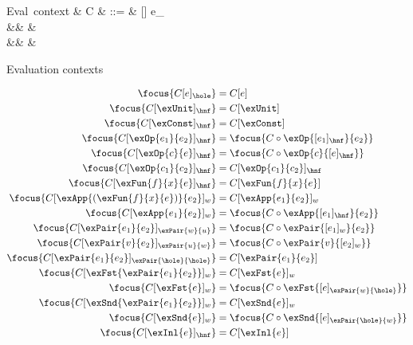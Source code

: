 \begin{figure}
\begin{syntaxfig}
\mbox{Eval context}
&
C
&
::=
&
[]
\mid
e_{\hole}
\mid
{}
\mid
{}
\mid
{}
\mid
{}
\mid
{}
\mid
\\
&&
\mid
&
\mid
{}
\mid
{}
\mid
{}
\mid
{}
\\
&&
\mid
&
\mid
{}
\end{syntaxfig}
\caption{Evaluation contexts}
\end{figure}

\begin{figure*}
\begin{align*}
\focus{C[e]_{\hole}}
& =
C[e]
\\
\focus{C[\exUnit]_{\hnf}}
& =
C[\exUnit]
\\
\focus{C[\exConst]_{\hnf}}
& =
C[\exConst]
\\
\focus{C[\exOp{e_1}{e_2}]_{\hnf}}
& =
\focus{C \circ \exOp{[e_1]_{\hnf}}{e_2}}
\\
\focus{C[\exOp{c}{e}]_{\hnf}}
& =
\focus{C \circ \exOp{c}{[e]_{\hnf}}}
\\
\focus{C[\exOp{c_1}{c_2}]_{\hnf}}
& =
C[\exOp{c_1}{c_2}]_{\hnf}
\\
\focus{C[\exFun{f}{x}{e}]_{\hnf}}
& =
C[\exFun{f}{x}{e}]
\\
\focus{C[\exApp{(\exFun{f}{x}{e})}{e_2}]_{w}}
& =
C[\exApp{e_1}{e_2}]_{w}
\\
\focus{C[\exApp{e_1}{e_2}]_{w}}
& =
\focus{C \circ \exApp{[e_1]_{\hnf}}{e_2}}
\\
\focus{C[\exPair{e_1}{e_2}]_{\exPair{w}{u}}}
& =
\focus{C \circ \exPair{[e_1]_{w}}{e_2}}
\\
\focus{C[\exPair{v}{e_2}]_{\exPair{u}{w}}}
& =
\focus{C \circ \exPair{v}{[e_2]_{w}}}
\\
\focus{C[\exPair{e_1}{e_2}]_{\exPair{\hole}{\hole}}}
& =
C[\exPair{e_1}{e_2}]
\\
\focus{C[\exFst{\exPair{e_1}{e_2}}]_{w}}
& =
C[\exFst{e}]_{w}
\\
\focus{C[\exFst{e}]_{w}}
& =
\focus{C \circ \exFst{[e]_{\exPair{w}{\hole}}}}
\\
\focus{C[\exSnd{\exPair{e_1}{e_2}}]_{w}}
& =
C[\exSnd{e}]_{w}
\\
\focus{C[\exSnd{e}]_{w}}
& =
\focus{C \circ \exSnd{[e]_{\exPair{\hole}{w}}}}
\\
\focus{C[\exInl{e}]_{\hnf}}
& =
C[\exInl{e}]
\\

\end{align*}
\end{figure*}
